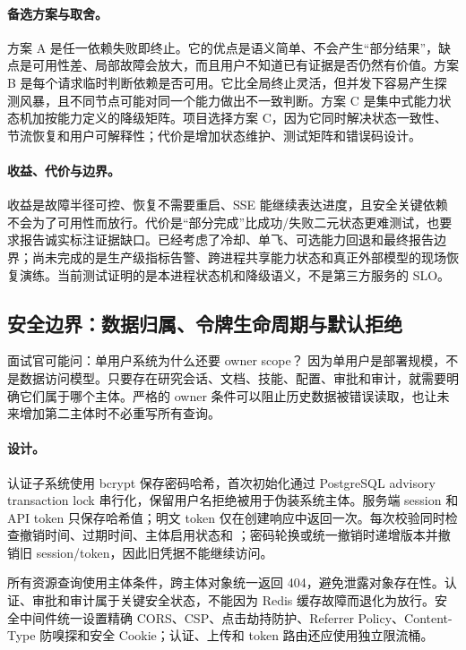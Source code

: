 \paragraph{备选方案与取舍。}
方案 A 是任一依赖失败即终止。它的优点是语义简单、不会产生“部分结果”，缺点是可用性差、局部故障会放大，而且用户不知道已有证据是否仍然有价值。方案 B 是每个请求临时判断依赖是否可用。它比全局终止灵活，但并发下容易产生探测风暴，且不同节点可能对同一个能力做出不一致判断。方案 C 是集中式能力状态机加按能力定义的降级矩阵。项目选择方案 C，因为它同时解决状态一致性、节流恢复和用户可解释性；代价是增加状态维护、测试矩阵和错误码设计。

\paragraph{收益、代价与边界。}
收益是故障半径可控、恢复不需要重启、SSE 能继续表达进度，且安全关键依赖不会为了可用性而放行。代价是“部分完成”比成功/失败二元状态更难测试，也要求报告诚实标注证据缺口。已经考虑了冷却、单飞、可选能力回退和最终报告边界；尚未完成的是生产级指标告警、跨进程共享能力状态和真正外部模型的现场恢复演练。当前测试证明的是本进程状态机和降级语义，不是第三方服务的 SLO。

\subsection{安全边界：数据归属、令牌生命周期与默认拒绝}

\begin{qaBox}{面试官可能问：单用户系统为什么还要 owner scope？}
因为单用户是部署规模，不是数据访问模型。只要存在研究会话、文档、技能、配置、审批和审计，就需要明确它们属于哪个主体。严格的 owner 条件可以阻止历史数据被错误读取，也让未来增加第二主体时不必重写所有查询。
\end{qaBox}

\paragraph{设计。}
认证子系统使用 bcrypt 保存密码哈希，首次初始化通过 PostgreSQL advisory transaction lock 串行化，保留用户名拒绝被用于伪装系统主体。服务端 session 和 API token 只保存哈希值；明文 token 仅在创建响应中返回一次。每次校验同时检查撤销时间、过期时间、主体启用状态和 ；密码轮换或统一撤销时递增版本并撤销旧 session/token，因此旧凭据不能继续访问。

所有资源查询使用主体条件，跨主体对象统一返回 404，避免泄露对象存在性。认证、审批和审计属于关键安全状态，不能因为 Redis 缓存故障而退化为放行。安全中间件统一设置精确 CORS、CSP、点击劫持防护、Referrer Policy、Content-Type 防嗅探和安全 Cookie；认证、上传和 token 路由还应使用独立限流桶。

